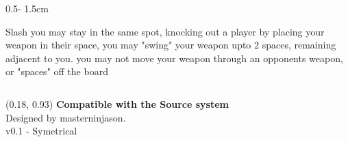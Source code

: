 \documentclass{uioposter}
\begin{document}
\begin{frame}
\begin{columns}[onlytextwidth]
\begin{column}{0.5\textwidth - 1.5cm}
    \begin{block}{Slash}
        you may stay in the same spot, knocking out a player by placing your weapon in their space, you may "swing" your weapon upto 2 spaces, remaining adjacent to you. you may not move your weapon through an opponents weapon, or "spaces" off the board
    \end{block}

\end{column}


\end{columns}


\begin{textblock}{0.5}(0.18, 0.93)
    \color{white}
    \sffamily
    \textbf{Compatible with the Source system}
    \\
    Designed by masterninjason.
    \\
    v0.1 - Symetrical
\end{textblock}


\end{frame}
\end{document}
